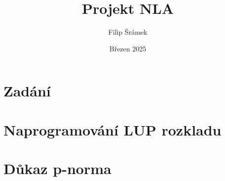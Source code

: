 \documentclass[11pt,a4paper]{article}
\title{Projekt NLA}
\author{Filip Šrámek}
\date{Březen 2025}
\begin{document}
\maketitle

\section*{Zadání}
\section{Naprogramování LUP rozkladu}
\section{Důkaz p-norma}
\end{document}
